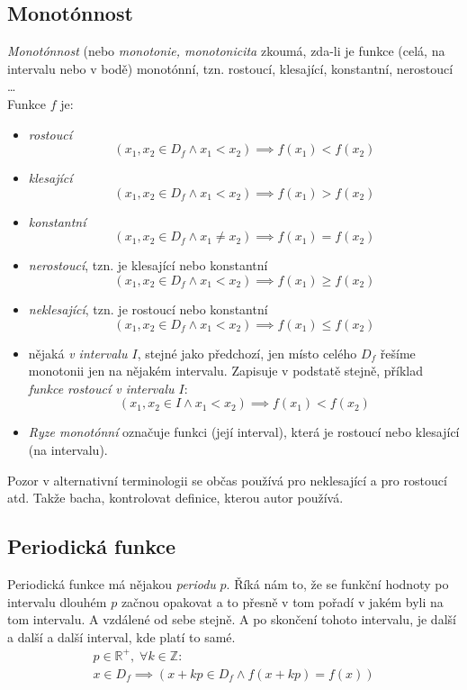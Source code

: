 \documentclass[12pt]{article}
\newcommand{\nR}{\mathbb{R}} %
\newcommand{\nZ}{\mathbb{Z}} %
\begin{document}
\subsection{Monotónnost}
\emph{Monotónnost} (nebo \emph{monotonie, monotonicita} zkoumá, zda-li je funkce (celá, na intervalu nebo v bodě) monotónní, tzn. rostoucí, klesající, konstantní, nerostoucí \dots \\
Funkce $f$ je:
\begin{itemize}
\item \emph{rostoucí}
\begin{equation}
(x_1,x_2 \in D_f \land x_1 < x_2) \implies f(x_1) < f(x_2)
\end{equation}
\item \emph{klesající}
\begin{equation}
(x_1,x_2 \in D_f \land x_1 < x_2) \implies f(x_1) > f(x_2)
\end{equation}
\item \emph{konstantní}
\begin{equation}
(x_1,x_2 \in D_f \land x_1 \neq x_2) \implies f(x_1) = f(x_2)
\end{equation}
\item \emph{nerostoucí}, tzn. je klesající nebo konstantní
\begin{equation}
(x_1,x_2 \in D_f \land x_1 < x_2) \implies f(x_1) \geq f(x_2)
\end{equation}
\item \emph{neklesající}, tzn. je rostoucí nebo konstantní
\begin{equation}
(x_1,x_2 \in D_f \land x_1 < x_2) \implies f(x_1) \leq f(x_2)
\end{equation}
\item nějaká \emph{v intervalu $I$}, stejné jako předchozí, jen místo celého $D_f$ řešíme monotonii jen na nějakém intervalu. Zapisuje v podstatě stejně, příklad \emph{funkce rostoucí v intervalu $I$}:
\begin{equation}
(x_1,x_2 \in I \land x_1 < x_2) \implies f(x_1) < f(x_2)
\end{equation}
\item \emph{Ryze monotónní} označuje funkci (její interval), která je rostoucí nebo klesající (na intervalu).
\end{itemize}
Pozor v alternativní terminologii se občas používá  pro neklesající a  pro rostoucí atd. Takže bacha, kontrolovat definice, kterou autor používá.
\subsection{Periodická funkce}
Periodická funkce má nějakou \emph{periodu} $p$. Říká nám to, že se funkční hodnoty po intervalu dlouhém $p$ začnou opakovat a to přesně v tom pořadí v jakém byli na tom intervalu. A vzdálené od sebe stejně. A po skončení tohoto intervalu, je další a další a další interval, kde platí to samé.
\begin{align}
p \in \nR^{+}, \; \forall k \in \nZ: \\
x \in D_f \implies \left( x + kp \in D_f \land f(x+kp) = f(x) \right)
\end{align}
\end{document}
